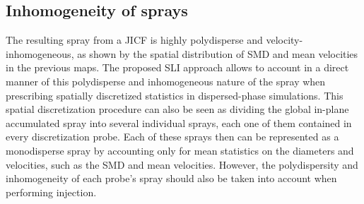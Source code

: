 \clearpage



\subsection{Inhomogeneity of sprays}
\label{subsec:SPS_inhomogeneity_sprays}

The resulting spray from a JICF is highly polydisperse and velocity-inhomogeneous, as shown by the spatial distribution of SMD and mean velocities in the previous maps. The proposed SLI approach allows to account in a direct manner of this polydisperse and inhomogeneous nature of the spray when prescribing spatially discretized statistics in dispersed-phase simulations. This spatial discretization procedure can also be seen as dividing the global in-plane accumulated spray into several individual sprays, each one of them contained in every discretization probe. Each of these sprays then can be represented as a monodisperse spray by accounting only for mean statistics on the diameters and velocities, such as the SMD and mean velocities. However, the polydispersity and inhomogeneity of each probe's spray should also be taken into account when performing injection.

